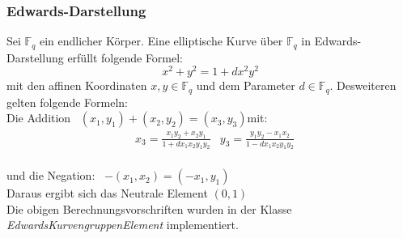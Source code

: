 \documentclass{scrartcl}
\begin{document}
\subsubsection{Edwards-Darstellung}
\label{sec:edwards_kurven}
Sei $\mathbb{F}_q$ ein endlicher Körper.
Eine elliptische Kurve über $\mathbb{F}_q$ in Edwards-Darstellung erfüllt folgende Formel:
$$ x^2+y^2= 1+dx^2y^2$$
mit den affinen Koordinaten $x,y \in \mathbb{F}_q$ und dem Parameter $d \in \mathbb{F}_q$.
Desweiteren gelten folgende Formeln: \vspace{5pt}\\
Die Addition \ $(x_1,y_1)+(x_2,y_2)=(x_3,y_3)$\quad mit: \\
\begin{align*}
  &x_3=\frac{x_1y_2 + x_2 y_1} { 1 + d x_1 x_2  y_1y_2}
  &y_3=\frac{y_1 y_2 - x_1 x_2}{1 - d x_1  x_2 y_1  y_2}
\end{align*}\\
und die Negation: \ $-(x_1,x_2)=(-x_1,y_1) $ \vspace{5pt} \\
Daraus ergibt sich das Neutrale Element  $(0, 1)$\\
Die obigen Berechnungsvorschriften wurden in der Klasse  \emph{EdwardsKurvengruppenElement} implementiert.
\end{document}
